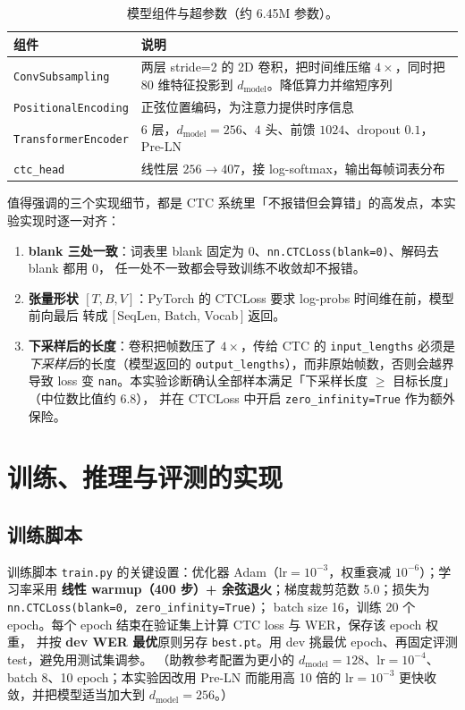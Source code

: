 \documentclass[a4paper]{article}
\begin{document}
\begin{table}[H]
  \centering
  \begin{tabularx}{\textwidth}{l X}
  \toprule
  组件 & 说明 \\
  \midrule
  \texttt{ConvSubsampling} & 两层 stride=2 的 2D 卷积，把时间维压缩 $4\times$，同时把 80 维特征投影到 $d_{\text{model}}$。降低算力并缩短序列 \\
  \texttt{PositionalEncoding} & 正弦位置编码，为注意力提供时序信息 \\
  \texttt{TransformerEncoder} & $6$ 层，$d_{\text{model}}{=}256$、$4$ 头、前馈 $1024$、dropout $0.1$，Pre-LN \\
  \texttt{ctc\_head} & 线性层 $256\rightarrow 407$，接 log-softmax，输出每帧词表分布 \\
  \bottomrule
  \end{tabularx}
  \caption{模型组件与超参数（约 6.45M 参数）。}
  \label{tab:model}
\end{table}

值得强调的三个实现细节，都是 CTC 系统里「不报错但会算错」的高发点，本实验实现时逐一对齐：
\begin{enumerate}
  \item \textbf{blank 三处一致}：词表里 blank 固定为 0、\texttt{nn.CTCLoss(blank=0)}、解码去 blank 都用 0，
        任一处不一致都会导致训练不收敛却不报错。
  \item \textbf{张量形状 $[T,B,V]$}：PyTorch 的 CTCLoss 要求 log-probs 时间维在前，模型前向最后
        转成 $[\,$SeqLen, Batch, Vocab$\,]$ 返回。
  \item \textbf{下采样后的长度}：卷积把帧数压了 $4\times$，传给 CTC 的 \texttt{input\_lengths} 必须是
        \emph{下采样后}的长度（模型返回的 \texttt{output\_lengths}），而非原始帧数，否则会越界导致 loss 变
        \texttt{nan}。本实验诊断确认全部样本满足「下采样长度 $\ge$ 目标长度」（中位数比值约 6.8），
        并在 CTCLoss 中开启 \texttt{zero\_infinity=True} 作为额外保险。
\end{enumerate}

\section{训练、推理与评测的实现}
\subsection{训练脚本}
训练脚本 \texttt{train.py} 的关键设置：优化器 Adam（$\text{lr}=10^{-3}$，权重衰减 $10^{-6}$）；学习率采用
\textbf{线性 warmup（400 步）+ 余弦退火}；梯度裁剪范数 5.0；损失为 \texttt{nn.CTCLoss(blank=0, zero\_infinity=True)}；
batch size 16，训练 20 个 epoch。每个 epoch 结束在验证集上计算 CTC loss 与 WER，保存该 epoch 权重，
并按 \textbf{dev WER 最优}原则另存 \texttt{best.pt}。用 dev 挑最优 epoch、再固定评测 test，避免用测试集调参。
（助教参考配置为更小的 $d_{\text{model}}{=}128$、$\text{lr}=10^{-4}$、batch 8、10 epoch；本实验因改用 Pre-LN
而能用高 10 倍的 $\text{lr}=10^{-3}$ 更快收敛，并把模型适当加大到 $d_{\text{model}}{=}256$。）
\end{document}
